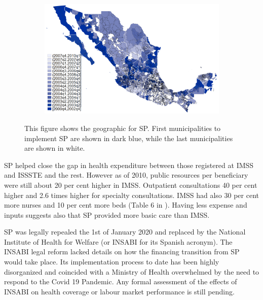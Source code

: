 \documentclass[oneside,11pt]{article}
\begin{document}
\vspace{.1in}
\begin{figure}[H]
     \caption{Geographical coverage of SP by municipality}
    \label{sp_geo_coverage}
    \vspace{-.2in}
\begin{center}
\begin{subfigure}{0.65\textwidth}
        \includegraphics[width=\textwidth]{Figuras/sp_geo_coverage.png}
    \end{subfigure}
  \end{center}
    \scriptsize 
    \vspace{-.1in}
  This figure shows the geographic for SP. First municipalities to implement SP are shown in dark blue, while the last municipalities are shown in white. 
\end{figure}

\vspace{.1in}


SP helped close the gap in health expenditure between those registered at IMSS and ISSSTE and the rest. However as of 2010, public resources per beneficiary were still about 20 per cent higher in IMSS. Outpatient consultations 40 per cent higher and 2.6 times higher for specialty consultations. IMSS had also 30 per cent more nurses and 10 per cent more beds (Table 6 in \cite{Lancet}). Having less expense and inputs suggests also that SP provided more basic care than IMSS.

SP was legally repealed the 1st of January 2020 and replaced by the National Institute of Health for Welfare (or INSABI for its Spanish acronym).  The INSABI legal reform lacked details on how the financing transition from SP would take place.  Its implementation process to date has been highly disorganized and coincided with a Ministry of Health overwhelmed by the need to respond to the Covid 19 Pandemic.  Any formal assessment of the effects of INSABI on health coverage or labour market performance is still pending.  
\end{document}
